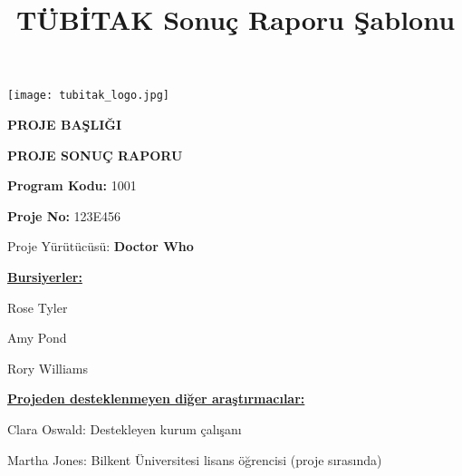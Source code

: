 \documentclass[11pt]{article}
\title{TÜBİTAK Sonuç Raporu Şablonu}
\begin{document}
\pagestyle{fancy}
   \lhead{}\rhead{}
   \lfoot{\textcolor{light-gray}{\small Proje Sonuç Raporu}}
        \cfoot{{\thepage}}
        \rfoot{}
  \renewcommand{\headrulewidth}{0pt}

\renewcommand{\figurename}{\bf Şekil}
\renewcommand{\tablename}{\bf Tablo}
\renewcommand{\contentsname}{İçindekiler}
\renewcommand{\refname}{Referanslar}
\renewcommand{\listfigurename}{Şekiller}
\renewcommand{\listtablename}{Tablolar}


\newpage
\phantom{22}
\vspace{-3cm}

\begin{center}
\texttt{[image: tubitak\_logo.jpg]}

\bigskip
\bigskip


\bigskip
{\fontsize{15}{10}\selectfont 
\bigskip


\bigskip
\medskip
{ \textbf{\Huge PROJE BAŞLIĞI \\}}}


\bigskip
\medskip
{ \textbf{ PROJE SONUÇ RAPORU}}
\bigskip

\end{center}


\bigskip

\bigskip


\thispagestyle{empty}


\begin{center}
\medskip
{\LARGE \textbf{Program Kodu:} 1001}

\bigskip
{\LARGE \textbf{Proje No:} 123E456}

\bigskip
{\LARGE Proje Yürütücüsü: \textbf{Doctor Who}}

\end{center}

\bigskip


\bigskip
\noindent
{\large
\noindent
\underline{\bf Bursiyerler:}

\noindent
Rose Tyler

\noindent
Amy Pond

\noindent
Rory Williams

\noindent \underline{\bf Projeden desteklenmeyen diğer araştırmacılar:}

\noindent
Clara Oswald:  Destekleyen kurum çalışanı

\noindent
Martha Jones: Bilkent Üniversitesi lisans öğrencisi (proje sırasında)


}
\end{document}
